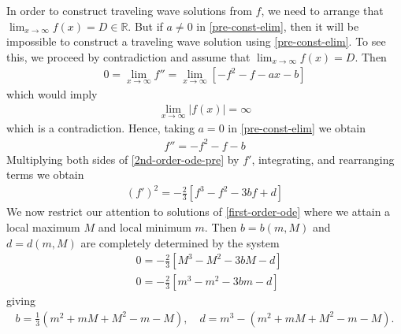 \documentclass[12pt,reqno]{amsart}
\numberwithin{equation}{section}  %
\newcommand{\rr}{\mathbb{R}}
\begin{document}
%
%
In order to construct traveling wave solutions from $f$, we need to arrange that
$\lim_{x \to \infty} f(x) = D \in \rr$. But if $a \neq 0$ in
\eqref{pre-const-elim}, then it will be impossible to construct a traveling wave
solution using \eqref{pre-const-elim}. To see this, we proceed by contradiction
and assume that $\lim_{x \to
\infty} f(x) = D$. Then
%
%
\begin{equation*}
\begin{split}
  0 = \lim_{x \to \infty} f'' = \lim_{x \to \infty} [-f^{2} -f - ax -b]
\end{split}
\end{equation*}
%
%
which would imply
%
%
\begin{equation*}
\begin{split}
  \lim_{x \to \infty} | f(x) |  = \infty
\end{split}
\end{equation*}
%
%
which is a contradiction. Hence, taking $a = 0$ in \eqref{pre-const-elim} we
obtain
%
\begin{equation}
  \label{2nd-order-ode-pre}
\begin{split}
  f'' = - f^{2} -f -b 
\end{split}
\end{equation}
%
%
Multiplying both sides of \eqref{2nd-order-ode-pre} by $f'$, integrating, and rearranging terms we obtain 
%
\begin{equation}
  \label{first-order-ode}
\begin{split}
  (f')^{2} = -\frac{2}{3} \left [ f^{3} -f^{2} - 3bf +d
  \right ]
\end{split}
\end{equation}
%
%
We now restrict our attention to solutions of \eqref{first-order-ode} where
we attain a local maximum $M$ and local minimum $m$. Then $b = b(m, M)$ and $d =
d(m, M)$ are 
completely determined by the system
%
%
\begin{equation*}
\begin{split}
  & 0 = -\frac{2}{3} \left [ M^{3} -M^{2} - 3bM - d
  \right ]
  \\
  & 0 = -\frac{2}{3} \left [ m^{3} -m^{2} - 3bm - d
  \right ]
\end{split}
\end{equation*}
%
giving
%
%
\begin{equation}
  \label{b-val}
\begin{split}
  b = \frac{1}{3}\left( m^{2} + mM + M^{2} -m - M\right), \quad d= m^{3} -(
  m^{2} + mM + M^{2} - m - M).
\end{split}
\end{equation}
\end{document}
